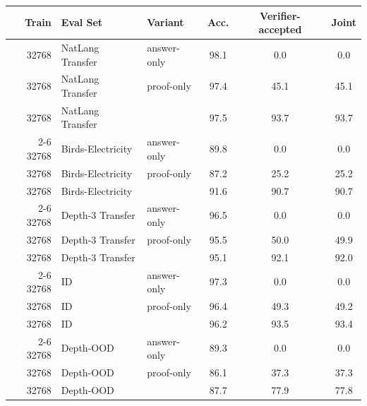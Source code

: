 \begin{tabular}{rllccc}
\toprule
Train & Eval Set & Variant & Acc. & Verifier-accepted & Joint \\
\midrule
32768 & NatLang Transfer & answer-only & 98.1 & 0.0 & 0.0 \\
32768 & NatLang Transfer & proof-only & 97.4 & 45.1 & 45.1 \\
32768 & NatLang Transfer & \model{} & 97.5 & 93.7 & 93.7 \\
\cmidrule(lr){2-6}
32768 & Birds-Electricity & answer-only & 89.8 & 0.0 & 0.0 \\
32768 & Birds-Electricity & proof-only & 87.2 & 25.2 & 25.2 \\
32768 & Birds-Electricity & \model{} & 91.6 & 90.7 & 90.7 \\
\cmidrule(lr){2-6}
32768 & Depth-3 Transfer & answer-only & 96.5 & 0.0 & 0.0 \\
32768 & Depth-3 Transfer & proof-only & 95.5 & 50.0 & 49.9 \\
32768 & Depth-3 Transfer & \model{} & 95.1 & 92.1 & 92.0 \\
\cmidrule(lr){2-6}
32768 & ID & answer-only & 97.3 & 0.0 & 0.0 \\
32768 & ID & proof-only & 96.4 & 49.3 & 49.2 \\
32768 & ID & \model{} & 96.2 & 93.5 & 93.4 \\
\cmidrule(lr){2-6}
32768 & Depth-OOD & answer-only & 89.3 & 0.0 & 0.0 \\
32768 & Depth-OOD & proof-only & 86.1 & 37.3 & 37.3 \\
32768 & Depth-OOD & \model{} & 87.7 & 77.9 & 77.8 \\
\bottomrule
\end{tabular}